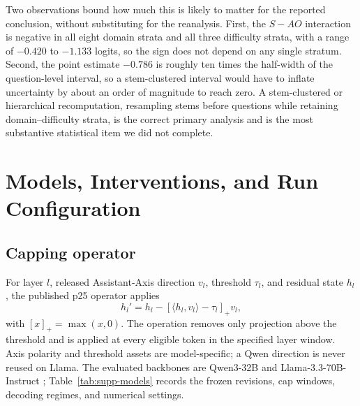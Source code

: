 \documentclass[letterpaper]{article}
\begin{document}
Two observations bound how much this is likely to matter for the reported conclusion, without substituting for the reanalysis. First, the $S-AO$ interaction is negative in all eight domain strata and all three difficulty strata, with a range of $-0.420$ to $-1.133$ logits, so the sign does not depend on any single stratum. Second, the point estimate $-0.786$ is roughly ten times the half-width of the question-level interval, so a stem-clustered interval would have to inflate uncertainty by about an order of magnitude to reach zero. A stem-clustered or hierarchical recomputation, resampling stems before questions while retaining domain--difficulty strata, is the correct primary analysis and is the most substantive statistical item we did not complete.

\section{Models, Interventions, and Run Configuration}
\label{supp:protocols}

\subsection{Capping operator}

For layer $l$, released Assistant-Axis direction $v_l$, threshold $\tau_l$, and residual state $h_l$, the published p25 operator \citep{lu2026assistant} applies
\begin{equation}
h_l' = h_l-\left[\langle h_l,v_l\rangle-\tau_l\right]_+v_l,
\end{equation}
with $[x]_+=\max(x,0)$.  The operation removes only projection above the threshold and is applied at every eligible token in the specified layer window.  Axis polarity and threshold assets are model-specific; a Qwen direction is never reused on Llama.  The evaluated backbones are Qwen3-32B \citep{yang2025qwen3} and Llama-3.3-70B-Instruct \citep{meta2024llama33}; Table~\ref{tab:supp-models} records the frozen revisions, cap windows, decoding regimes, and numerical settings.
\end{document}
